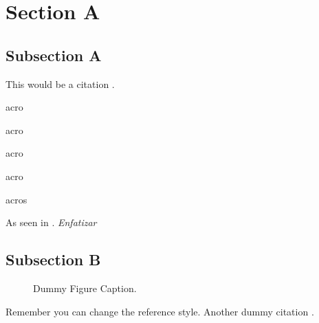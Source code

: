 \section{Section A}
\label{sec:sectiona}

\subsection{Subsection A}
\label{subsec:subasectionA}

This would be a citation \cite{dummy}.

\ac{acro}

\acf{acro}

\acs{acro}

\acl{acro}

\acp{acro}

As seen in \cite{wiki}. \emph{Enfatizar}

\subsection{Subsection B}
\label{subsec:subbsectiona}

\begin{figure}[H]
  \centering
  
  \caption[Dummy Figure Caption for List of Figures.]{Dummy Figure Caption.}
  \label{fig:dummyfigure1}
\end{figure}

Remember you can change the reference style. Another dummy citation \cite{site}.
